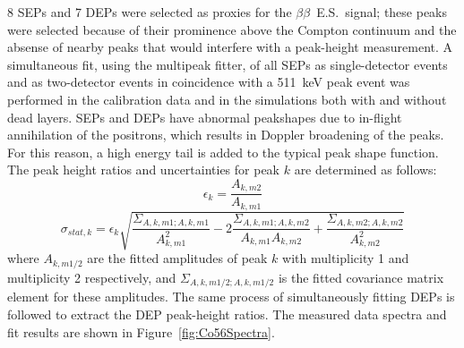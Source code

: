 \documentclass[notitlepage,rmp,aps,10pt]{revtex4-1}
\newcommand{\bb}{${\beta \beta}$}
\newcommand{\bbes}{\bb~E.S.}
\begin{document}
8 SEPs and 7 DEPs were selected as proxies for the \bbes\ signal; these peaks were selected because of their prominence above the Compton continuum and the absense of nearby peaks that would interfere with a peak-height measurement.
A simultaneous fit, using the multipeak fitter, of all SEPs as single-detector events and as two-detector events in coincidence with a 511~keV peak event was performed in the calibration data and in the simulations both with and without dead layers.
SEPs and DEPs have abnormal peakshapes due to in-flight annihilation of the positrons, which results in Doppler broadening of the peaks.
For this reason, a high energy tail is added to the typical peak shape function.
The peak height ratios and uncertainties for peak $k$ are determined as follows:
\begin{equation}
  \epsilon_k=\frac{A_{k,m2}}{A_{k,m1}}
\end{equation}
\begin{equation}
  \sigma_{stat, k}=\epsilon_k \sqrt{\frac{\Sigma_{A,k,m1;A,k,m1}}{A_{k,m1}^2}-2\frac{\Sigma_{A,k,m1;A,k,m2}}{A_{k,m1}A_{k,m2}}+\frac{\Sigma_{A,k,m2;A,k,m2}}{A_{k,m2}^2}}
\end{equation}
where $A_{k,m1/2}$ are the fitted amplitudes of peak $k$ with multiplicity 1 and multiplicity 2 respectively, and $\Sigma_{A,k,m1/2;A,k,m1/2}$ is the fitted covariance matrix element for these amplitudes.
The same process of simultaneously fitting DEPs is followed to extract the DEP peak-height ratios.
The measured data spectra and fit results are shown in Figure~\ref{fig:Co56Spectra}.
\end{document}

